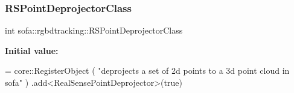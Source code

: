 \subsubsection{\texorpdfstring{R\+S\+Point\+Deprojector\+Class}{RSPointDeprojectorClass}}
{\footnotesize\ttfamily int sofa\+::rgbdtracking\+::\+R\+S\+Point\+Deprojector\+Class}

{\bfseries Initial value\+:}
\begin{DoxyCode}
= core::RegisterObject ( \textcolor{stringliteral}{"deprojects a set of 2d points to a 3d point cloud in sofa"} )
        .add<RealSensePointDeprojector>(\textcolor{keyword}{true})
\end{DoxyCode}
